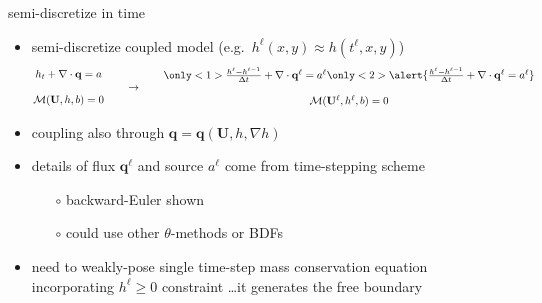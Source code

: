 \documentclass[xcolor={dvipsnames}]{beamer}
\newcommand\bq{\mathbf{q}}
\newcommand\bU{\mathbf{U}}
\newcommand\Div{\nabla\cdot}
\newcommand\grad{\nabla}
\begin{document}
\newcommand{\singletsmc}{\frac{h^\ell - h^{\ell-1}}{\Delta t} + \Div \bq^\ell = a^\ell}
\begin{frame}{semi-discretize in time}

\begin{itemize}
\item semi-discretize coupled model (e.g.~$h^\ell(x,y) \approx h(t^\ell,x,y)$)
$$\begin{matrix}
 h_t + \Div\bq = a \\
 \phantom{foo} \\
 \mathcal{M}(\bU,h,b) = 0
\end{matrix} \qquad \to \qquad \begin{matrix}
 \only<1>{\singletsmc} \only<2>{\alert{\singletsmc}} \\
 \phantom{foo} \\
 \mathcal{M}(\bU^\ell,h^\ell,b) = 0
\end{matrix}$$
\item coupling also through $\bq=\bq(\bU,h,\grad h)$
\item details of flux $\bq^\ell$ and source $a^\ell$ come from time-stepping scheme
        \begin{itemize}
        \item[$\circ$] backward-Euler shown
        \item[$\circ$] could use other $\theta$-methods or BDFs
        \end{itemize}
\item<2> \alert{need to weakly-pose single time-step mass conservation equation incorporating $h^\ell\ge 0$ constraint \dots it generates the free boundary}
\end{itemize}
\end{frame}
\end{document}
